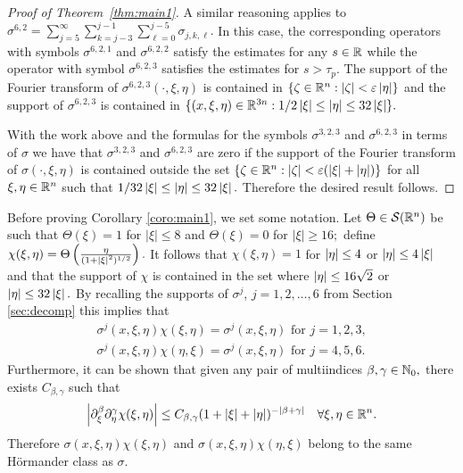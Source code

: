 \begin{proof}[Proof of Theorem~\ref{thm:main1}]
A similar reasoning applies to $\sigma^{6,2}=\sum_{j=5}^\infty\sum_{k=j-3}^{j-1}\sum_{\ell=0}^{j-5}\sigma_{j,k,\ell}.$ In this case, the corresponding operators with symbols $\sigma^{6,2,1}$ and $\sigma^{6,2,2}$ satisfy the estimates for any $s\in \mathbb{R}$ while the operator with symbol $\sigma^{6,2,3}$ satisfies the estimates for $s>\tau_p.$ The support of the Fourier transform of  $\sigma^{6,2,3}(\cdot,\xi,\eta)$ is contained in  $\{\zeta\in{{\mathbb R}^n}: \left\vert \zeta \right\vert< \varepsilon\left\vert \eta \right\vert\}$ and the support of $\sigma^{6,2,3}$ is contained   in  $\{(x,\xi,\eta)\in\mathbb{R}^{3n}: 1/2\left\vert \xi \right\vert\le\left\vert \eta \right\vert\le 32\left\vert \xi \right\vert\}.$

With the work above and the formulas for the symbols $\sigma^{3,2,3}$ and $\sigma^{6,2,3}$ in terms of $\sigma$ we have that $\sigma^{3,2,3}$ and $\sigma^{6,2,3}$ are zero if  the support of the Fourier transform of $\sigma(\cdot,\xi,\eta)$ is contained outside the set 
$\{\zeta\in{{\mathbb R}^n}:\left\vert \zeta \right\vert<\varepsilon (\left\vert \xi \right\vert+\left\vert \eta \right\vert)\}$ for all  $\xi,\eta\in{{\mathbb R}^n}$ such that $1/32\left\vert \xi \right\vert\le \left\vert \eta \right\vert\le 32 \left\vert \xi \right\vert.$ Therefore the desired result follows.
\end{proof}


Before proving Corollary \ref{coro:main1}, we set some notation. Let  $\Theta\in {\mathcal{S}}({{\mathbb R}^n})$ be such that $\Theta(\xi)=1$ for $|\xi|\le 8$ and $\Theta(\xi)=0$ for $|\xi|\ge 16;$ define $\chi(\xi,\eta)=\Theta\left(\frac{\eta}{(1+\left\vert \xi \right\vert^2)^{1/2}}\right).$ It follows that $\chi(\xi,\eta)=1$ for $\left\vert \eta \right\vert\le 4$ or $\left\vert \eta \right\vert\le 4\left\vert \xi \right\vert$ and that the support of  $\chi$ is contained in the set where $ \left\vert \eta \right\vert\le 16 \sqrt{2}$ or $\left\vert \eta \right\vert\le 32\left\vert \xi \right\vert.$ By recalling the supports of $\sigma^j$, $j = 1,2,\dots,6$ from Section \ref{sec:decomp} this implies  that 
 \begin{align*}
 \sigma^{j}(x,\xi,\eta)\chi(\xi,\eta)=\sigma^{j}(x,\xi,\eta) \text{ for } j=1,2, 3,\\
  \sigma^{j}(x,\xi,\eta)\chi(\eta,\xi)=\sigma^{j}(x,\xi,\eta)\text{ for } j=4, 5,6.
 \end{align*}
 Furthermore, it can be shown that given any pair of multiindices $\beta,\gamma\in \mathbb{N}_0,$ there exists $C_{\beta,\gamma}$ such that
 \begin{equation*}
 \left\vert \partial_\xi^\beta\partial_\eta^\gamma\chi(\xi,\eta) \right\vert\le C_{\beta,\gamma} (1+\left\vert \xi \right\vert+\left\vert \eta \right\vert)^{-\left\vert \beta+\gamma \right\vert}\quad \forall \xi,\eta\in {{\mathbb R}^n}.
 \end{equation*}
 Therefore $\sigma(x,\xi,\eta)\chi(\xi,\eta)$ and $\sigma(x,\xi,\eta)\chi(\eta,\xi)$ belong to the same H\"ormander class as $\sigma.$



